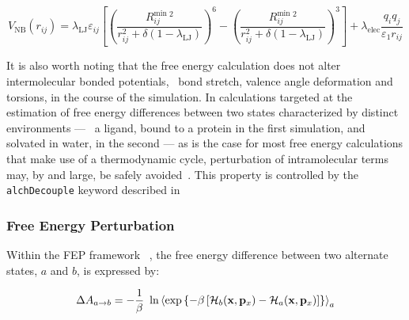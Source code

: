 \begin{equation}
\label{eqn:softcore}
V_\mathrm{NB}(r_{ij}) = \lambda_\mathrm{LJ} \varepsilon_{ij} \left[ \left(\frac{R^\mathrm{min}_{ij}\,^2}{r_{ij}^2+\delta(1-\lambda_\mathrm{LJ})}\right)^{\!\!6}  -  \left(\frac{R^\mathrm{min}_{ij}\,^2}{r_{ij}^2+\delta(1-\lambda_\mathrm{LJ})}\right)^{\!\!3} \right]
+ \lambda_\mathrm{elec} \frac{q_iq_j}{\varepsilon_1 r_{ij}}
\end{equation}


It is also worth noting that the free energy calculation does not alter
intermolecular bonded potentials, \eg~bond stretch, valence angle deformation
and torsions, in the course of the simulation. In calculations targeted at the
estimation of free energy differences between two states characterized by
distinct environments --- \eg~a ligand, bound to a protein in the first
simulation, and solvated in water, in the second --- as is the case for most
free energy calculations that make use of a thermodynamic cycle, perturbation
of intramolecular terms may, by and large, be safely
avoided~\cite{Boresch1999}.  This property is controlled by the {\tt alchDecouple} keyword described in  



\subsubsection{Free Energy Perturbation}
\label{section:fepintro}


Within the FEP framework
~\cite{Beveridge1989,Chipot2002g,Chipot2007,Gilson1997,Kollman1993,Mark1998,Straatsma1992,VanGunsteren1989,Zwanzig1954},
the free energy difference between two
alternate states, $a$ and $b$, is expressed by:


\begin{equation}
\Delta A_{a \rightarrow b} = -\frac{1}{\beta} \ \ln
                              \left\langle \exp \left\{-\beta
                                                \left[{\cal H}_b({\bf x}, {\bf p}_x) -
                                                      {\cal H}_a({\bf x}, {\bf p}_x)
                                                \right]
                                                \right\}
                                                \right\rangle_a
\label{fep}
\end{equation}


